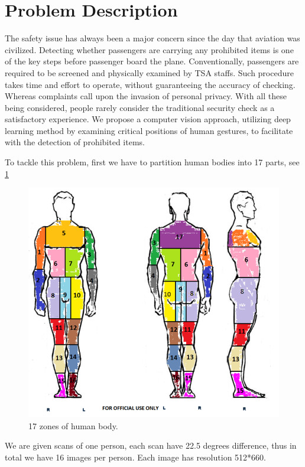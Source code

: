 \documentclass[conference,compsoc]{IEEEtran}
\begin{document}
\section{Problem Description}
	\par The safety issue has always been a major concern since the day that aviation was civilized. Detecting whether passengers are carrying any prohibited items is one of the key steps before passenger board the plane. Conventionally, passengers are required to be screened and physically examined by TSA staffs. Such procedure takes time and effort to operate, without guaranteeing the accuracy of checking. Whereas complaints call upon the invasion of personal privacy. With all these being considered, people rarely consider the traditional security check as a satisfactory experience. We propose a computer vision approach, utilizing deep learning method by examining critical positions of human gestures, to facilitate with the detection of prohibited items.
	\par To tackle this problem, first we have to partition human bodies into 17 parts, see \ref{bodyzones}
	\begin{figure} \label{bodyzones}
		\centering
		\includegraphics[width=\linewidth]{./Pic/body_zones}
		\caption{17 zones of human body.}
	\end{figure}
	\par We are given scans of one person, each scan have 22.5 degrees difference, thus in total we have 16 images per person. Each image has resolution 512*660. 
	
\end{document}
